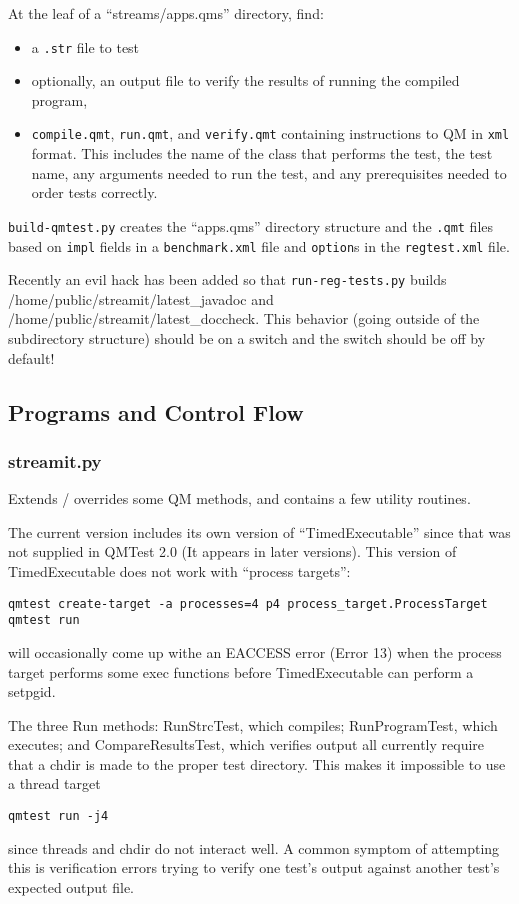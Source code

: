\documentclass[11pt]{article}
\begin{document}
At the leaf of a  ``streams/apps.qms'' directory, find: 
\begin{itemize}
\item a {\tt .str} file to test
\item optionally, an output file to verify the results of running the 
compiled program,
\item {\tt compile.qmt}, {\tt run.qmt}, and {\tt verify.qmt}
containing instructions to QM in {\tt xml} format.
This includes the name of the class that performs the test, the test
name, any arguments needed to run the test, and any prerequisites
needed to order tests correctly.
\end{itemize}
{\tt build-qmtest.py} creates the ``apps.qms'' directory structure and
the {\tt .qmt} files based on {\tt impl} fields in a {\tt benchmark.xml}
file and {\tt option}s in the {\tt regtest.xml} file.

Recently an evil hack has been added so that {\tt run-reg-tests.py} builds 
/home/public/streamit/latest\_javadoc and /home/public/streamit/latest\_doccheck.
This behavior (going outside of the subdirectory structure) should be on a switch
and the switch should be off by default!

\subsection{Programs and Control Flow}

\subsubsection{streamit.py}
Extends / overrides some QM methods, and contains a few utility routines.

The current version includes its own version of ``TimedExecutable''
since that was not supplied in QMTest 2.0 (It appears in later
versions).  This version of TimedExecutable does not work with
``process targets'':
\begin{verbatim}
qmtest create-target -a processes=4 p4 process_target.ProcessTarget
qmtest run
\end{verbatim}
will occasionally come up withe an EACCESS error (Error 13) when the
process target performs some exec functions before TimedExecutable can
perform a setpgid.

The three Run methods: RunStrcTest, which compiles; RunProgramTest,
which executes; and CompareResultsTest, which verifies output
all currently require that a chdir is made to the proper test
directory.
This makes it impossible to use a thread target
\begin{verbatim}
qmtest run -j4
\end{verbatim}
since threads and chdir do not interact well.
A common symptom of attempting this is verification errors trying to
verify one test's output against another test's expected output file.
\end{document}
